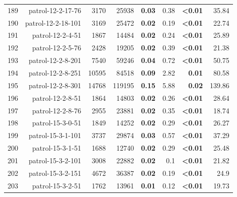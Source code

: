 \begin{longtable}{lrr@{\hskip 12pt}r@{\hskip 12pt}r@{\hskip 12pt}r@{\hskip 12pt}r@{\hskip 12pt}r}
189 & \multirow{1}{*}{patrol-12-2-17-76} & \multirow{1}{*}{3170} & \multirow{1}{*}{25938} & \textbf{0.03} & 0.38 & \textbf{<0.01} & 35.84 \\
190 & \multirow{1}{*}{patrol-12-2-18-101} & \multirow{1}{*}{3169} & \multirow{1}{*}{25472} & \textbf{0.02} & 0.19 & \textbf{<0.01} & 22.74 \\
191 & \multirow{1}{*}{patrol-12-2-4-51} & \multirow{1}{*}{1867} & \multirow{1}{*}{14484} & \textbf{0.02} & 0.24 & \textbf{<0.01} & 25.89 \\
192 & \multirow{1}{*}{patrol-12-2-5-76} & \multirow{1}{*}{2428} & \multirow{1}{*}{19205} & \textbf{0.02} & 0.39 & \textbf{<0.01} & 21.38 \\
193 & \multirow{1}{*}{patrol-12-2-8-201} & \multirow{1}{*}{7540} & \multirow{1}{*}{59246} & \textbf{0.04} & 0.72 & \textbf{<0.01} & 50.75 \\
194 & \multirow{1}{*}{patrol-12-2-8-251} & \multirow{1}{*}{10595} & \multirow{1}{*}{84518} & \textbf{0.09} & 2.82 & \textbf{0.01} & 80.58 \\
195 & \multirow{1}{*}{patrol-12-2-8-301} & \multirow{1}{*}{14768} & \multirow{1}{*}{119195} & \textbf{0.15} & 5.88 & \textbf{0.02} & 139.86 \\
196 & \multirow{1}{*}{patrol-12-2-8-51} & \multirow{1}{*}{1864} & \multirow{1}{*}{14803} & \textbf{0.02} & 0.26 & \textbf{<0.01} & 28.64 \\
197 & \multirow{1}{*}{patrol-12-2-8-76} & \multirow{1}{*}{2955} & \multirow{1}{*}{23881} & \textbf{0.02} & 0.35 & \textbf{<0.01} & 18.74 \\
198 & \multirow{1}{*}{patrol-15-3-0-51} & \multirow{1}{*}{1849} & \multirow{1}{*}{14252} & \textbf{0.02} & 0.29 & \textbf{<0.01} & 26.27 \\
199 & \multirow{1}{*}{patrol-15-3-1-101} & \multirow{1}{*}{3737} & \multirow{1}{*}{29874} & \textbf{0.03} & 0.57 & \textbf{<0.01} & 37.29 \\
200 & \multirow{1}{*}{patrol-15-3-1-51} & \multirow{1}{*}{1688} & \multirow{1}{*}{12740} & \textbf{0.02} & 0.29 & \textbf{<0.01} & 25.48 \\
201 & \multirow{1}{*}{patrol-15-3-2-101} & \multirow{1}{*}{3008} & \multirow{1}{*}{22882} & \textbf{0.02} & 0.1 & \textbf{<0.01} & 21.82 \\
202 & \multirow{1}{*}{patrol-15-3-2-151} & \multirow{1}{*}{4672} & \multirow{1}{*}{36387} & \textbf{0.02} & 0.19 & \textbf{<0.01} & 24.9 \\
203 & \multirow{1}{*}{patrol-15-3-2-51} & \multirow{1}{*}{1762} & \multirow{1}{*}{13961} & \textbf{0.01} & 0.12 & \textbf{<0.01} & 19.73 \\

\end{longtable}
